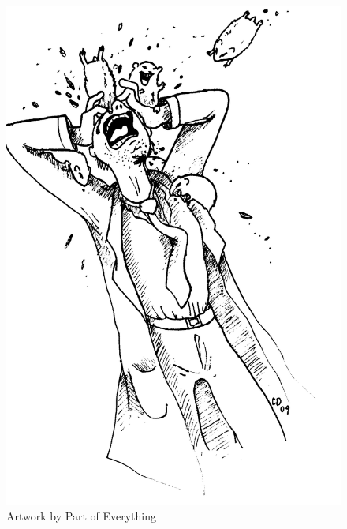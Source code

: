 \begin{figure}[b]
  \includegraphics[width=\textwidth]{art/Part_of_Everything-Death_Hamsters.png}
  \caption{Artwork by Part of Everything}
\end{figure}
